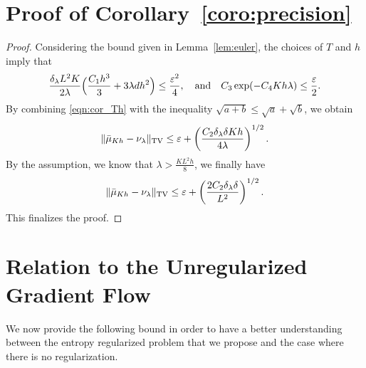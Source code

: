 \section{Proof of Corollary~\ref{coro:precision}}
\begin{proof}
Considering the bound given in Lemma~\ref{lem:euler}, the choices of $T$ and $h$ imply that
\begin{align}
\frac{\delta_\lambda L^2 K}{2\lambda} \Bigl( \frac{C_1 h^3}{3} + 3 \lambda d h^2 \Bigr) \leq \frac{\varepsilon^2}{4}, \quad \text{and} \quad C_3 \exp(-C_4 Kh \lambda) \leq \frac{\varepsilon}{2}. \label{eqn:cor_Th}
\end{align}
By combining \eqref{eqn:cor_Th} with the inequality $\sqrt{a+b}\leq \sqrt{a} + \sqrt{b}$, we obtain 
\begin{align}
\| \bar{\mu}_{Kh} - \nu_\lambda \|_{\textnormal{TV}} \leq \varepsilon + \left(\frac{C_2 \delta_\lambda \delta K h}{4\lambda}\right)^{1/2} .
\end{align}
By the assumption, we know that $\lambda > \frac{KL^2h}{8}$, we finally have
\begin{align}
\| \bar{\mu}_{Kh} - \nu_\lambda \|_{\textnormal{TV}} \leq \varepsilon + \left(\frac{2 C_2 \delta_\lambda \delta}{L^2}\right)^{1/2} .
\end{align}
This finalizes the proof. 
\end{proof}

\section{Relation to the Unregularized Gradient Flow}

We now provide the following bound in order to have a better understanding between the entropy regularized problem that we propose and the case where there is no regularization.

